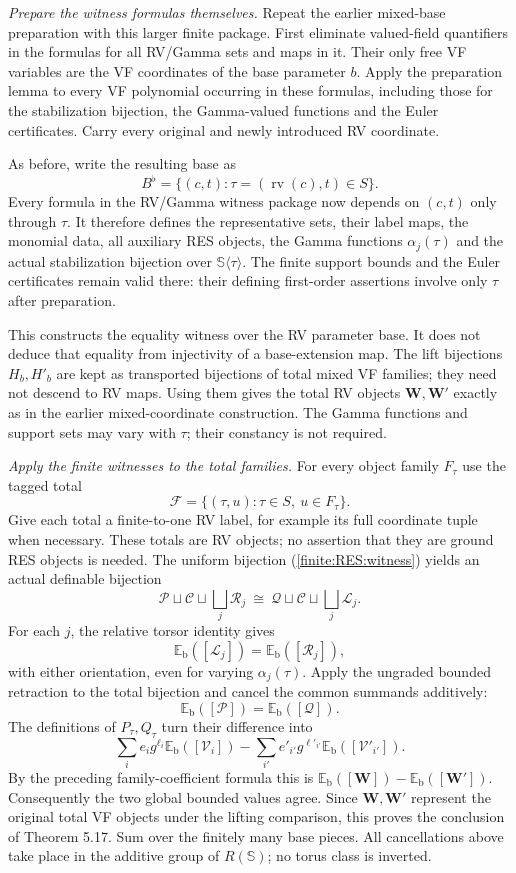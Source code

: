 \documentclass[12pt]{amsart}
\theoremstyle{remark}
\theoremstyle{definition}
\newcommand{\rv}{\operatorname{rv}}
\newcommand{\Sbase}{\mathbb S}
\numberwithin{equation}{section}
\theoremstyle{plain}
\theoremstyle{plain}
\begin{document}
{\medskip
\noindent\emph{Prepare the witness formulas themselves.}
Repeat the earlier mixed-base preparation with this larger
finite package.
First eliminate valued-field quantifiers in the formulas
for all RV/Gamma sets and maps in it.
Their only free VF variables are the VF coordinates of
the base parameter $b$. Apply the preparation lemma to
every VF polynomial occurring in these formulas, including
those for the stabilization bijection, the Gamma-valued
functions and the Euler certificates.
Carry every original and newly introduced RV coordinate.

As before, write the resulting base as
\[
 B^\flat=\{(c,t):\tau=(\rv(c),t)\in S\}.
\]
Every formula in the RV/Gamma witness package now depends
on $(c,t)$ only through $\tau$.
It therefore defines the representative sets, their label
maps, the monomial data, all auxiliary RES objects,
the Gamma functions $\alpha_j(\tau)$ and the actual
stabilization bijection over $\Sbase\langle\tau\rangle$.
The finite support bounds and the Euler certificates remain
valid there: their defining first-order assertions involve
only $\tau$ after preparation.

This constructs the equality witness over the RV parameter
base. It does not deduce that equality from injectivity of
a base-extension map.
The lift bijections $H_b,H'_b$ are kept as transported
bijections of total mixed VF families; they need not
descend to RV maps.
Using them gives the total RV objects
$\bm W,\bm W'$ exactly as in the earlier mixed-coordinate
construction.
The Gamma functions and support sets may vary with
$\tau$; their constancy is not required.

\medskip
\noindent\emph{Apply the finite witnesses to the total families.}
For every object family $F_\tau$ use the tagged total
\[
 \mathcal F=\{(\tau,u):\tau\in S,\ u\in F_\tau\}.
\]
Give each total a finite-to-one RV label, for example its
full coordinate tuple when necessary.
These totals are RV objects; no assertion that they are
ground RES objects is needed.
The uniform bijection (\ref{finite:RES:witness}) yields
an actual definable bijection
\[
 \mathcal P\sqcup\mathcal C\sqcup\bigsqcup_j\mathcal R_j
       \ \cong\
 \mathcal Q\sqcup\mathcal C\sqcup\bigsqcup_j\mathcal L_j .
\]
For each $j$, the relative torsor identity gives
\[
 \mathbb E_{\mathrm b}([\mathcal L_j])
       =\mathbb E_{\mathrm b}([\mathcal R_j]),
\]
with either orientation, even for varying
$\alpha_j(\tau)$.
Apply the ungraded bounded retraction to the total
bijection and cancel the common summands additively:
\[
 \mathbb E_{\mathrm b}([\mathcal P])
       =\mathbb E_{\mathrm b}([\mathcal Q]).
\]
The definitions of $P_\tau,Q_\tau$ turn their difference
into
\[
 \sum_i e_i g^{\ell_i}\mathbb E_{\mathrm b}([\mathcal V_i])
   -\sum_{i'}e'_{i'}g^{\ell'_{i'}}
                   \mathbb E_{\mathrm b}([\mathcal V'_{i'}]).
\]
By the preceding family-coefficient formula this is
$\mathbb E_{\mathrm b}([\bm W])
 -\mathbb E_{\mathrm b}([\bm W'])$.
Consequently the two global bounded values agree.
Since $\bm W,\bm W'$ represent the original total
VF objects under the lifting comparison, this proves
the conclusion of Theorem 5.17.
Sum over the finitely many base pieces.
All cancellations above take place in the additive
group of $R(\Sbase)$; no torus class is inverted.
}
\end{document}
